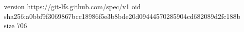 version https://git-lfs.github.com/spec/v1
oid sha256:a0bbf9f3069867bcc18986f5e3b8bde20d09444570285904cd682089d2fc188b
size 706
